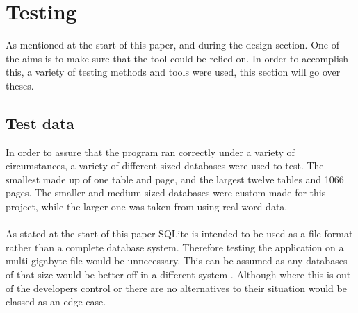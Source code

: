 %
%
%
%
%
%

\section{Testing}
\label{sec:testing}

As mentioned at the start of this paper, and during the design section. One of the aims is to make sure that the tool could be relied on. In order to accomplish this, a variety of testing methods and tools were used, this section will go over theses.

\subsection{Test data}
\label{subsec:test_data}

In order to assure that the program ran correctly under a variety of circumstances, a variety of different sized databases were used to test. The smallest made up of one table and page, and the largest twelve tables and 1066 pages. The smaller and medium sized  databases were custom made for this project, while the larger one was taken from \cite{largedatabase} using real word data.
\\\\
As stated at the start of this paper SQLite is intended to be used as a file format rather than a complete database system. Therefore testing the application on a multi-gigabyte file would be unnecessary. This can be assumed as any databases of that size would be better off in a different system \citep{sqlite}. Although where this is out of the developers control or there are no alternatives to their situation would be classed as an edge case.
 
